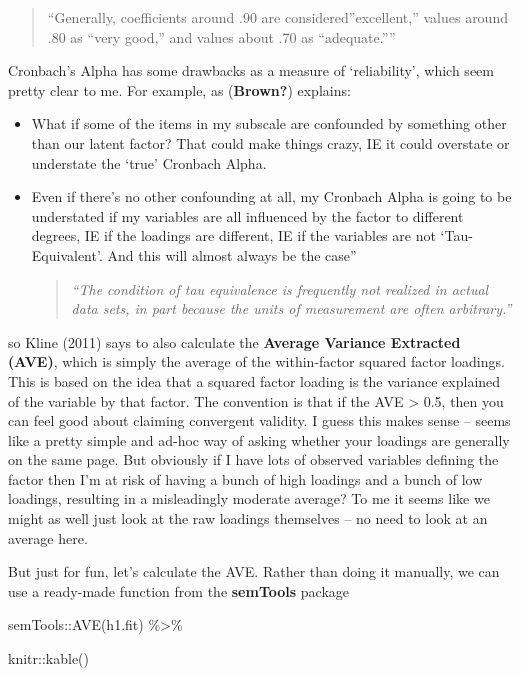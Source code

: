 \documentclass[
  letterpaper,
  DIV=11,
  numbers=noendperiod]{scrreprt}
\newenvironment{Shaded}{\begin{snugshade}}{\end{snugshade}}
\newcommand{\FunctionTok}[1]{\textcolor[rgb]{0.28,0.35,0.67}{#1}}
\newcommand{\NormalTok}[1]{\textcolor[rgb]{0.00,0.23,0.31}{#1}}
\newcommand{\SpecialCharTok}[1]{\textcolor[rgb]{0.37,0.37,0.37}{#1}}
\begin{document}
\begin{quote}
``Generally, coefficients around .90 are considered''excellent,'' values
around .80 as ``very good,'' and values about .70 as ``adequate.''''
\end{quote}

Cronbach's Alpha has some drawbacks as a measure of `reliability', which
seem pretty clear to me. For example, as (\textbf{Brown?}) explains:

\begin{itemize}
\item
  What if some of the items in my subscale are confounded by something
  other than our latent factor? That could make things crazy, IE it
  could overstate or understate the `true' Cronbach Alpha.
\item
  Even if there's no other confounding at all, my Cronbach Alpha is
  going to be understated if my variables are all influenced by the
  factor to different degrees, IE if the loadings are different, IE if
  the variables are not `Tau-Equivalent'. And this will almost always be
  the case''

  \begin{quote}
  \emph{``The condition of tau equivalence is frequently not realized in
  actual data sets, in part because the units of measurement are often
  arbitrary.''}
  \end{quote}
\end{itemize}

so Kline (2011) says to also calculate the \textbf{Average Variance
Extracted (AVE)}, which is simply the average of the within-factor
squared factor loadings. This is based on the idea that a squared factor
loading is the variance explained of the variable by that factor. The
convention is that if the AVE \textgreater{} 0.5, then you can feel good
about claiming convergent validity. I guess this makes sense -- seems
like a pretty simple and ad-hoc way of asking whether your loadings are
generally on the same page. But obviously if I have lots of observed
variables defining the factor then I'm at risk of having a bunch of high
loadings and a bunch of low loadings, resulting in a misleadingly
moderate average? To me it seems like we might as well just look at the
raw loadings themselves -- no need to look at an average here.

But just for fun, let's calculate the AVE. Rather than doing it
manually, we can use a ready-made function from the \textbf{semTools}
package

\begin{Shaded}
\begin{Highlighting}[]
\NormalTok{semTools}\SpecialCharTok{::}\FunctionTok{AVE}\NormalTok{(h1.fit) }\SpecialCharTok{\%\textgreater{}\%} 
  
\NormalTok{  knitr}\SpecialCharTok{::}\FunctionTok{kable}\NormalTok{()}
\end{Highlighting}
\end{Shaded}
\end{document}
